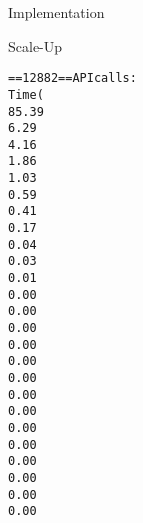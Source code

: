 \documentclass{article}
\begin{document}
\begin{section}{Implementation}
\begin{subsection}{Scale-Up}
\begin{alltt}
        ==12882== API calls:
        Time(%)      Time     Calls       Avg       Min       Max  Name
        85.39%  1.33983s      2054  652.30us  4.1210us  337.62ms  cuStreamSynchronize
        6.29%  98.630ms         1  98.630ms  98.630ms  98.630ms  cuDevicePrimaryCtxRetain
        4.16%  65.316ms         1  65.316ms  65.316ms  65.316ms  cuDevicePrimaryCtxRelease
        1.86%  29.147ms      5144  5.6660us  5.0490us  325.27us  cuMemcpyDtoDAsync
        1.03%  16.215ms         1  16.215ms  16.215ms  16.215ms  cuMemHostAlloc
        0.59%  9.2858ms         1  9.2858ms  9.2858ms  9.2858ms  cuMemFreeHost
        0.41%  6.4971ms      2049  3.1700us  2.9330us  23.480us  cuMemcpyHtoDAsync
        0.17%  2.7347ms     10288     265ns     211ns  2.7000us  cuPointerGetAttributes
        0.04%  695.98us         4  174.00us  3.9990us  241.37us  cuMemAlloc
        0.03%  409.59us         1  409.59us  409.59us  409.59us  cuMemAllocHost
        0.01%  149.14us         1  149.14us  149.14us  149.14us  cuModuleLoadData
        0.00%  32.707us         4  8.1760us  6.7910us  10.511us  cuLaunchKernel
        0.00%  21.719us         1  21.719us  21.719us  21.719us  cuStreamCreate
        0.00%  20.038us         1  20.038us  20.038us  20.038us  cuMemcpyDtoHAsync
        0.00%  5.6230us         2  2.8110us     454ns  5.1690us  cuEventCreate
        0.00%  2.5610us         1  2.5610us  2.5610us  2.5610us  cuEventRecord
        0.00%  2.2920us         3     764ns     163ns  1.7650us  cuDeviceGetCount
        0.00%  1.8190us         3     606ns     293ns  1.0710us  cuCtxSetCurrent
        0.00%  1.3030us         3     434ns     272ns     731ns  cuDeviceGet
        0.00%  1.1740us         1  1.1740us  1.1740us  1.1740us  cuModuleGetFunction
        0.00%  1.1310us         4     282ns     250ns     338ns  cuDeviceGetAttribute
        0.00%  1.0130us         1  1.0130us  1.0130us  1.0130us  cuEventSynchronize
        0.00%     317ns         1     317ns     317ns     317ns  cuMemFree
        0.00%     292ns         1     292ns     292ns     292ns  cuCtxGetCurrent
        0.00%     289ns         1     289ns     289ns     289ns  cuDeviceComputeCapability


\end{alltt}
\end{subsection}
\end{section}
\end{document}
